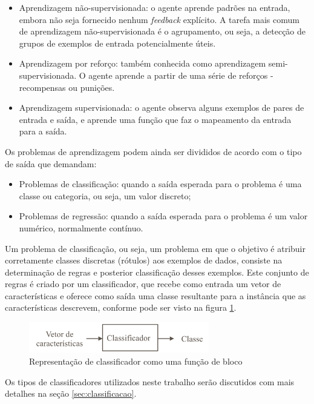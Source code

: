 \begin{itemize}
    \item Aprendizagem não-supervisionada: o agente aprende padrões na entrada, embora não seja fornecido nenhum \textit{feedback} explícito. A tarefa mais comum de aprendizagem não-supervisionada é o agrupamento, ou seja, a detecção de grupos de exemplos de entrada potencialmente úteis.
    \item Aprendizagem por reforço: também conhecida como aprendizagem semi-supervisionada. O agente aprende a partir de uma série de reforços - recompensas ou punições.
    \item Aprendizagem supervisionada: o agente observa alguns exemplos de pares de entrada e saída, e aprende uma função que faz o mapeamento da entrada para a saída.
\end{itemize}

Os problemas de aprendizagem podem ainda ser divididos de acordo com o tipo de saída que demandam:

\begin{itemize}
	\item Problemas de classificação: quando a saída esperada para o problema é uma classe ou categoria, ou seja, um valor discreto;
	\item Problemas de regressão: quando a saída esperada para o problema é um valor numérico, normalmente contínuo.
\end{itemize}

Um problema de classificação, ou seja, um problema em que o objetivo é atribuir corretamente classes discretas (rótulos) aos exemplos de dados, consiste na determinação de regras e posterior classificação desses exemplos. Este conjunto de regras é criado por um classificador, que recebe como entrada um vetor de características e oferece como saída uma classe resultante para a instância que as características descrevem, conforme pode ser visto na figura \ref{fig:classificador}.

\begin{figure}[h!]
  \centering
  \includegraphics[width=0.7\textwidth]{imgs/classificador}
  \caption{Representação de classificador como uma função de bloco}
  \label{fig:classificador}
\end{figure}

Os tipos de classificadores utilizados neste trabalho serão discutidos com mais detalhes na seção \ref{sec:classificacao}.

